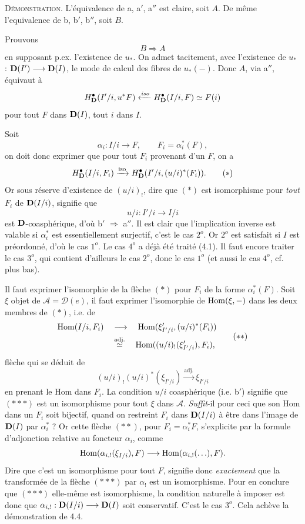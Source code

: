 \textsc{Démonstration}. L'équivalence de a, a$'$, a$''$ est claire, soit $A$. De même l'equivalence de b, b$'$, b$''$, soit $B$. %

Prouvons
\[
B \Longrightarrow A
\]
en supposant p.ex. l'existence de $u_*$. On admet tacitement, avec l'existence de $u_*$ : $\mathbf{D}(I') \longrightarrow \mathbf{D}(I)$, le mode de calcul des fibres de $u_*(-)$. Donc $A$, via a$''$, équivaut à
\[
H^{\bullet}_{\mathbf{D}}(I'/i, u^*F) \xleftarrow{\mathit{iso}} H^{\bullet}_{\mathbf{D}}(I/i, F) \simeq F(i)
\]
pour tout $F$ dans $\mathbf{D}(I)$, tout $i$ dans $I$.

Soit
\[
\alpha_i : I/i \longrightarrow F, \qquad F_i = \alpha_i^*(F), %
\]
on doit donc exprimer que pour tout $F_i$ provenant d'un $F$, on a
\[
H^{\bullet}_{\bD}(I/i, F_i) \xrightarrow{\mathrm{iso}} H^{\bullet}_{\bD}(I'/i, (u/i)^*(F_i)). \tag*{$(\ast)$}
\]
Or sous réserve d'existence de $(u/i)_!$, dire que $(\ast)$ est isomorphisme pour \textit{tout} $F_i$ de $\mathbf{D}(I/i)$, signifie que
\[
u/i : I'/i \longrightarrow I/i
\]
est $\mathbf{D}$-coasphérique, d'où b$'$ $\Longrightarrow$ a$''$. Il est clair que l'implication inverse est valable si $\alpha_i^*$ est essentiellement surjectif, c'est le cas $2^o$. Or $2^o$ est satisfait si $I$ est préordonné, d'où le cas $1^o$. Le cas $4^o$ a déjà été traité (4.1). Il faut encore traiter le cas $3^o$, qui contient d'ailleurs le cas $2^o$, donc le cas $1^o$ (et aussi le cas $4^o$, cf. plus bas).

Il faut exprimer l'isomorphie de la flèche $(\ast)$ pour $F_i$ de la forme $\alpha_i^*(F)$. Soit $\xi$ objet de $\mathcal{A} = \mathcal{D}(e)$, il faut exprimer l'isomorphie de $\operatorname{Hom}(\xi, -)$ dans les deux membres de $(\ast)$, i.e. de
\[
\begin{aligned}
\Hom(I/i, F_i) \quad &\longrightarrow \quad \Hom(\xi'_{I'/i}, (u/i)^*(F_i)) \\
&\overset{\text{adj.}}{\simeq} \quad \Hom((u/i)_!(\xi'_{I'/i}), F_i),
\end{aligned}
\tag*{$(\ast\ast)$}
\]
 flèche qui se déduit de
\[
(u/i)_!(u/i)^*(\xi_{I'/i}) \xrightarrow{\text{adj.}} \xi_{I'/i} \tag*{$(\ast\ast\ast)$}
\]
en prenant le Hom dans $F_i$. La condition $u/i$ coasphérique (i.e. b$'$) signifie que $(\ast\ast\ast)$ est un isomorphisme pour tout $\xi$ dans $\mathcal{A}$. \textit{Suffit}-il pour ceci que son Hom dans un $F_i$ soit bijectif, quand on restreint $F_i$ dans $\mathbf{D}(I/i)$ à être dans l'image de $\mathbf{D}(I)$ par $\alpha_i^*$ ? Or cette flèche $(\ast\ast)$, pour $F_i = \alpha_i^*F$, s'explicite par la formule d'adjonction relative au foncteur $\alpha_i$, comme
\[
\operatorname{Hom}(\alpha_{i,!}(\xi_{I/i}), F) \longrightarrow \operatorname{Hom}(\alpha_{i,!}(\ldots), F).
\]
Dire que c'est un isomorphisme pour tout $F$, signifie donc \textit{exactement} que la transformée de la flèche $(\ast\ast\ast)$ par $\alpha_!$ est un isomorphisme. Pour en conclure que $(\ast\ast\ast)$ elle-même est isomorphisme, la condition naturelle à imposer est donc que $\alpha_{i,!} : \mathbf{D}(I/i) \longrightarrow \mathbf{D}(I)$ soit conservatif. C'est le cas $3^o$. Cela achève la démonstration de 4.4.


